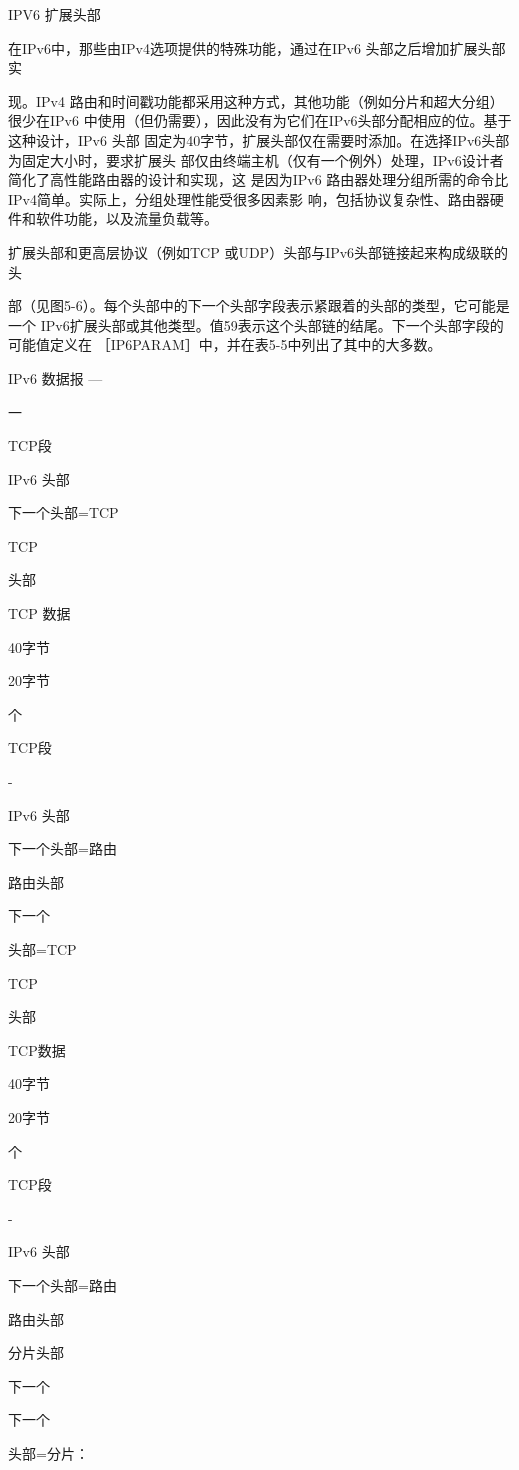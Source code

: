 IPV6 扩展头部

在IPv6中，那些由IPv4选项提供的特殊功能，通过在IPv6 头部之后增加扩展头部实

现。IPv4 路由和时间戳功能都采用这种方式，其他功能（例如分片和超大分组）很少在IPv6
中使用（但仍需要），因此没有为它们在IPv6头部分配相应的位。基于这种设计，IPv6 头部
固定为40字节，扩展头部仅在需要时添加。在选择IPv6头部为固定大小时，要求扩展头
部仅由终端主机（仅有一个例外）处理，IPv6设计者简化了高性能路由器的设计和实现，这
是因为IPv6 路由器处理分组所需的命令比 IPv4简单。实际上，分组处理性能受很多因素影
响，包括协议复杂性、路由器硬件和软件功能，以及流量负载等。

扩展头部和更高层协议（例如TCP 或UDP）头部与IPv6头部链接起来构成级联的头

部（见图5-6）。每个头部中的下一个头部字段表示紧跟着的头部的类型，它可能是一个
IPv6扩展头部或其他类型。值59表示这个头部链的结尾。下一个头部字段的可能值定义在
［IP6PARAM］中，并在表5-5中列出了其中的大多数。

IPv6 数据报 —

一

TCP段

IPv6 头部

下一个头部=TCP

TCP

头部

TCP 数据

40字节

20字节

个

TCP段

-

IPv6 头部

下一个头部=路由

路由头部

下一个

头部=TCP

TCP

头部

TCP数据

40字节

20字节

个

TCP段

-

IPv6 头部

下一个头部=路由

路由头部

分片头部

下一个

下一个

头部=分片：

